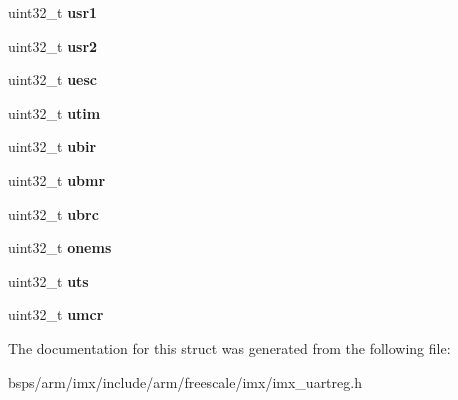 \begin{DoxyCompactItemize}
uint32\+\_\+t {\bfseries usr1}
\item 
\mbox{\label{structimx__uart_adbc16015c4b2dd19c6bbc32f0ac31d16}} 
uint32\+\_\+t {\bfseries usr2}
\item 
\mbox{\label{structimx__uart_aaefa6b9425121f4e31ba474ca282fa28}} 
uint32\+\_\+t {\bfseries uesc}
\item 
\mbox{\label{structimx__uart_a0b0f52f594e4324ececf4287ef6172ba}} 
uint32\+\_\+t {\bfseries utim}
\item 
\mbox{\label{structimx__uart_a980e754475a7c00be2cc2eec8c9579a8}} 
uint32\+\_\+t {\bfseries ubir}
\item 
\mbox{\label{structimx__uart_a84107b79cbfcf04f034d06ee5510feeb}} 
uint32\+\_\+t {\bfseries ubmr}
\item 
\mbox{\label{structimx__uart_ade9cd5978abaaf914bc5cd7d2de7cd7d}} 
uint32\+\_\+t {\bfseries ubrc}
\item 
\mbox{\label{structimx__uart_a91c51d268865ecb03a8ca9f5c61072e6}} 
uint32\+\_\+t {\bfseries onems}
\item 
\mbox{\label{structimx__uart_aa8e491e0ce2a8d1bbf301c3156a28625}} 
uint32\+\_\+t {\bfseries uts}
\item 
\mbox{\label{structimx__uart_a37430f3bebc9a04bbf5c7b7920bda467}} 
uint32\+\_\+t {\bfseries umcr}
\end{DoxyCompactItemize}


The documentation for this struct was generated from the following file\+:\begin{DoxyCompactItemize}
\item 
bsps/arm/imx/include/arm/freescale/imx/imx\+\_\+uartreg.\+h\end{DoxyCompactItemize}
